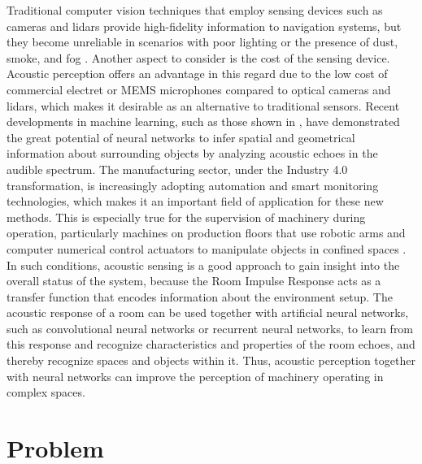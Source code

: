  Traditional computer vision techniques that employ sensing devices such as cameras and lidars provide high-fidelity information to navigation systems, but they become unreliable in scenarios with poor lighting or the presence of dust, smoke, and fog \cite{cat1}. Another aspect to consider is the cost of the sensing device. Acoustic perception offers an advantage in this regard due to the low cost of commercial electret or MEMS microphones compared to optical cameras and lidars, which makes it desirable as an alternative to traditional sensors. Recent developments in machine learning, such as those shown in \cite{bat1, cat1, echosense}, have demonstrated the great potential of neural networks to infer spatial and geometrical information about surrounding objects by analyzing acoustic echoes in the audible spectrum. The manufacturing sector, under the Industry 4.0 transformation, is increasingly adopting automation and smart monitoring technologies, which makes it an important field of application for these new methods. This is especially true for the supervision of machinery during operation, particularly machines on production floors that use robotic arms and computer numerical control actuators to manipulate objects in confined spaces \cite{mordor}. In such conditions, acoustic sensing is a good approach to gain insight into the overall status of the system, because the Room Impulse Response acts as a transfer function that encodes information about the environment setup. The acoustic response of a room can be used together with artificial neural networks, such as convolutional neural networks or recurrent neural networks, to learn from this response and recognize characteristics and properties of the room echoes, and thereby recognize spaces and objects within it. Thus, acoustic perception together with neural networks can improve the perception of machinery operating in complex spaces.  





\section{Problem}


